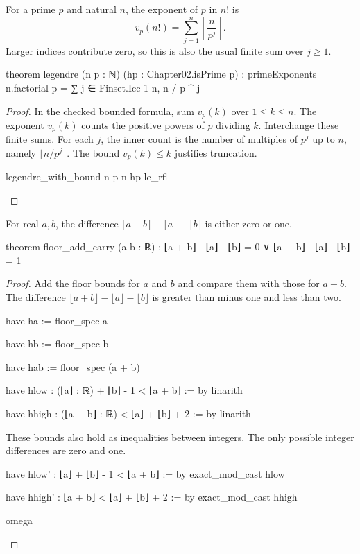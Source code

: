 \begin{theorem}
  \label{ent:thm:legendre}
  For a prime $p$ and natural $n$, the exponent of $p$ in $n!
  $ is \[ v_p(n!)=\sum_{j=1}^{n}\left\lfloor\frac{n}{p^j}\right\rfloor. \] Larger indices contribute zero, so this is also the usual finite sum over $j\ge1$.

  \begin{lean}
    theorem legendre (n p : ℕ) (hp : Chapter02.isPrime p) :
        primeExponents n.factorial p = ∑ j ∈ Finset.Icc 1 n, n / p ^ j
  \end{lean}
\end{theorem}

\begin{proof}
  In the checked bounded formula, sum $v_p(k)$ over $1\le k\le n$.
  The exponent $v_p(k)$ counts the positive powers of $p$ dividing $k$.
  Interchange these finite sums.
  For each $j$, the inner count is the number of multiples of $p^j$ up to $n$, namely $\lfloor
    n/p^j\rfloor$.
  The bound $v_p(k)\le k$ justifies truncation.

  \begin{lean}
    legendre_with_bound n p n hp le_rfl
  \end{lean}
\end{proof}

\begin{theorem}
  \label{ent:thm:floor-add-carry}
  For real $a,b$, the difference $\lfloor a+b\rfloor-\lfloor a\rfloor-\lfloor b\rfloor$ is either
  zero or one.

  \begin{lean}
    theorem floor_add_carry (a b : ℝ) :
        ⌊a + b⌋ - ⌊a⌋ - ⌊b⌋ = 0 ∨ ⌊a + b⌋ - ⌊a⌋ - ⌊b⌋ = 1
  \end{lean}
\end{theorem}

\begin{proof}
  Add the floor bounds for $a$ and $b$ and compare them with those for $a+b$.
  The difference $\lfloor a+b\rfloor-\lfloor a\rfloor-\lfloor b\rfloor$ is greater than minus one
  and less than two.

  \begin{lean}
    have ha := floor_spec a

    have hb := floor_spec b

    have hab := floor_spec (a + b)

    have hlow : (⌊a⌋ : ℝ) + ⌊b⌋ - 1 < ⌊a + b⌋ := by
      linarith

    have hhigh : (⌊a + b⌋ : ℝ) < ⌊a⌋ + ⌊b⌋ + 2 := by
      linarith
  \end{lean}

  These bounds also hold as inequalities between integers.
  The only possible integer differences are zero and one.

  \begin{lean}
    have hlow' : ⌊a⌋ + ⌊b⌋ - 1 < ⌊a + b⌋ := by
      exact_mod_cast hlow

    have hhigh' : ⌊a + b⌋ < ⌊a⌋ + ⌊b⌋ + 2 := by
      exact_mod_cast hhigh

    omega
  \end{lean}
\end{proof}

